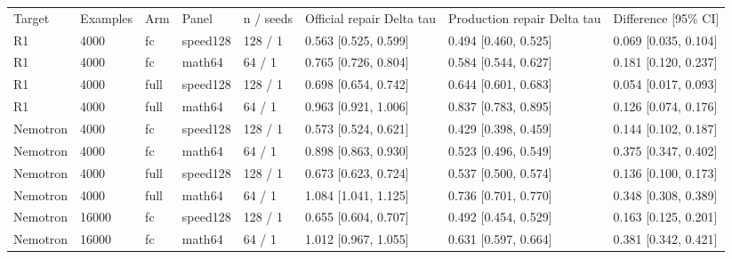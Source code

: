 \begin{tabular}{llllllll}
Target & Examples & Arm & Panel & n / seeds & Official repair Delta tau & Production repair Delta tau & Difference [95\% CI] \\
R1 & 4000 & fc & speed128 & 128 / 1 & 0.563 [0.525, 0.599] & 0.494 [0.460, 0.525] & 0.069 [0.035, 0.104] \\
R1 & 4000 & fc & math64 & 64 / 1 & 0.765 [0.726, 0.804] & 0.584 [0.544, 0.627] & 0.181 [0.120, 0.237] \\
R1 & 4000 & full & speed128 & 128 / 1 & 0.698 [0.654, 0.742] & 0.644 [0.601, 0.683] & 0.054 [0.017, 0.093] \\
R1 & 4000 & full & math64 & 64 / 1 & 0.963 [0.921, 1.006] & 0.837 [0.783, 0.895] & 0.126 [0.074, 0.176] \\
Nemotron & 4000 & fc & speed128 & 128 / 1 & 0.573 [0.524, 0.621] & 0.429 [0.398, 0.459] & 0.144 [0.102, 0.187] \\
Nemotron & 4000 & fc & math64 & 64 / 1 & 0.898 [0.863, 0.930] & 0.523 [0.496, 0.549] & 0.375 [0.347, 0.402] \\
Nemotron & 4000 & full & speed128 & 128 / 1 & 0.673 [0.623, 0.724] & 0.537 [0.500, 0.574] & 0.136 [0.100, 0.173] \\
Nemotron & 4000 & full & math64 & 64 / 1 & 1.084 [1.041, 1.125] & 0.736 [0.701, 0.770] & 0.348 [0.308, 0.389] \\
Nemotron & 16000 & fc & speed128 & 128 / 1 & 0.655 [0.604, 0.707] & 0.492 [0.454, 0.529] & 0.163 [0.125, 0.201] \\
Nemotron & 16000 & fc & math64 & 64 / 1 & 1.012 [0.967, 1.055] & 0.631 [0.597, 0.664] & 0.381 [0.342, 0.421] \\
\end{tabular}
